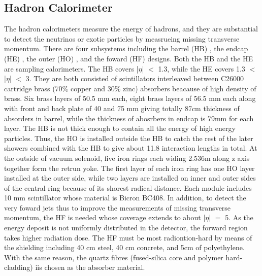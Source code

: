 \subsection{Hadron Calorimeter} 
The hadron calorimeters measure the energy of hadrons, and they are substantial to detect the neutrinos or exotic particles by measrueing missing transverse momentum.
There are four subsystems including the barrel (HB) , the endcap (HE) , the outer (HO) , and the foward (HF) designs.
Both the HB and the HE are sampling calorimeters. 
The HB covers |$\eta $| $<$ 1.3, while the HE covers 1.3 $<$ |$\eta $| $<$ 3.
They are both consisted of scintillators interleaved between C26000 cartridge brass (70$\% $ copper and 30$\% $ zinc) absorbers beacause of high density of brass.
Six brass layers of 50.5 mm each, eight brass layers of 56.5 mm each along with front and back plate of 40 and 75 mm giving totally 87cm thickness of absorders in barrel, while the thickness of abosrbers in endcap is 79mm for each layer.
The HB is not thick enough to contain all the energy of high energy particles.
Thus, the HO is installed outside the HB to catch the rest of the later showers combined with the HB to give about 11.8 interaction lengths in total. At the outside of vacuum solenoid, five iron rings each widing 2.536m along z axis together form the retrun yoke. The first layer of each iron ring has one HO layer installed at the outer side, while two layers are installed on inner and outer sides of the central ring because of its shorest radical distance. Each module includes 10 mm scintillator whose material is Bicron BC408.
In addition, to detect the very foward jets thus to improve the measurements of missing transverse momentum, the HF is needed whose coverage extends to about |$\eta $| $=$ 5.
As the energy deposit is not uniformly distributed in the detector, the forward region takes higher radiation dose.
The HF must be most radiontion-hard by means of the shielding including 40 cm steel, 40 cm concrete, and 5cm of polyethylene. With the same reason, the quartz fibres (fused-silica core and polymer hard-cladding) iis chosen as the absorber material.



